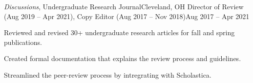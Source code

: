 \begin{ritemize}
{\textit{Discussions}, Undergraduate Research Journal}{Cleveland, OH}
{Director of Review (Aug 2019 -- Apr 2021), Copy Editor (Aug 2017 -- Nov 2018)}{Aug 2017 -- Apr 2021}
	\item Reviewed and revised 30+ undergraduate research articles for fall and spring publications.
	\item Created formal documentation that explains the review process and guidelines.
	\item Streamlined the peer-review process by intregrating with Scholastica.
\end{ritemize}